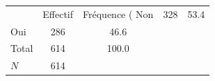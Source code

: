 {
\def\sym#1{\ifmmode^{#1}\else\(^{#1}\)\fi}
\begin{tabular}{l*{1}{cc}}
\toprule
            &    Effectif&Fréquence (%
\midrule
Non         &         328&        53.4\\
Oui         &         286&        46.6\\
Total       &         614&       100.0\\
\midrule
\(N\)       &         614&            \\
\bottomrule
\end{tabular}
}
